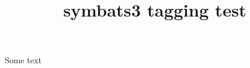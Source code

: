 \documentclass{article}
\title{symbats3 tagging test}
\begin{document}
Some text

\gemini

\admetos

\celtictrefoilknotopen
\end{document}
